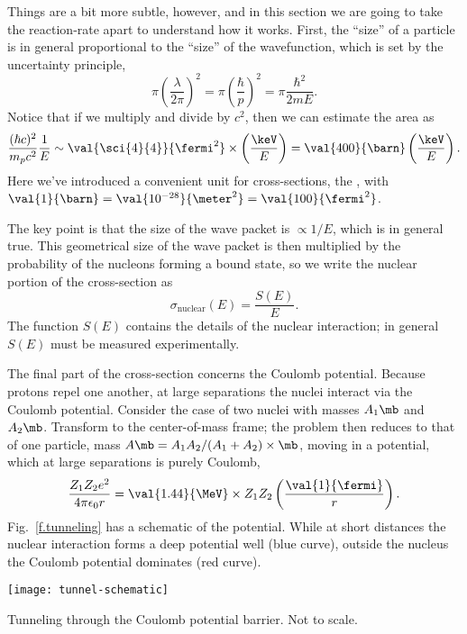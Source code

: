  Things are a bit more subtle, however, and in this section we are going to take the reaction-rate apart to understand how it works. First, the ``size'' of a particle is in general proportional to the ``size'' of the wavefunction, which is set by the uncertainty principle, 
\[\pi\left(\frac{\lambda}{2\pi}\right)^{2} = \pi \left(\frac{\hbar}{p}\right)^{2} = \pi\frac{\hbar^{2}}{2mE}.\]
Notice that if we multiply and divide by $c^{2}$, then we can estimate the area as
\[
	\frac{(\hbar c)^{2}}{m_{p} c^{2}} \frac{1}{E} \sim \val{\sci{4}{4}}{\fermi^{2}} \times \left(\frac{\keV}{E}\right) = \val{400}{\barn}\left(\frac{\keV}{E}\right).
\]	
Here we've introduced a convenient unit for cross-sections, the , with $\val{1}{\barn} = \val{10^{-28}}{\meter^{2}} = \val{100}{\fermi^{2}}$.

The key point is that the size of the wave packet is $\propto 1/E$, which is in general true. This geometrical size of the wave packet is then multiplied by the probability of the nucleons forming a bound state, so we write the nuclear portion of the cross-section as
\[
	\sigma_{\mathrm{nuclear}}(E) = \frac{S(E)}{E}.
\]
The function $S(E)$ contains the details of the nuclear interaction; in general $S(E)$ must be measured experimentally.

The final part of the cross-section concerns the Coulomb potential.
Because protons repel one another, at large separations the nuclei interact via the Coulomb potential. Consider the case of two nuclei with masses $A_{1}\mb$ and $A_{2}\mb$. Transform to the center-of-mass frame; the problem then reduces to that of one particle, mass $A\mb = A_{1}A_{2}/(A_{1}+A_{2})\times\mb$, moving in a potential, which at large separations is purely Coulomb,
\[ \frac{Z_{1}Z_{2}e^{2}}{4\pi\epsilon_{0}r} = \val{1.44}{\MeV}\times Z_{1}Z_{2}\left(\frac{\val{1}{\fermi}}{r}\right). \]
Fig.~\ref{f.tunneling} has a schematic of the potential. While at short distances the nuclear interaction forms a deep potential well (blue curve), outside the nucleus the Coulomb potential dominates (red curve).
\begin{marginfigure}
\texttt{[image: tunnel-schematic]}
\caption{Tunneling through the Coulomb potential barrier. Not to scale.}
\label{f.tunneling}
\end{marginfigure}

